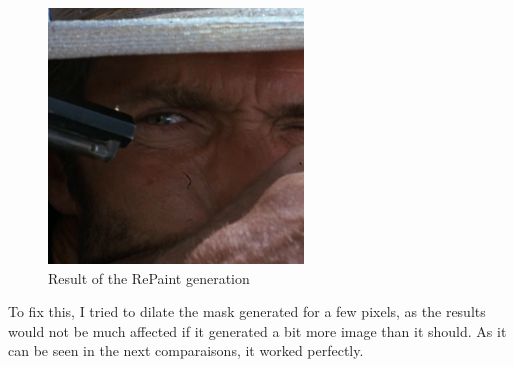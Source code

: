 \documentclass[openany, 12pt]{article}
\begin{document}
\begin{figure}[htbp]
\begin{minipage}{0.45\textwidth}
		\includegraphics[width=\textwidth]{images/bueno_feo_malo_frame_0129_inpaint.png}
		\caption{Result of the RePaint generation}
	\end{minipage}
\end{figure}
To fix this, I tried to dilate the mask generated for a few pixels, as the results would not be much affected if it generated a bit more image than it should. As it can be seen in the next comparaisons, it worked perfectly.
\end{document}
